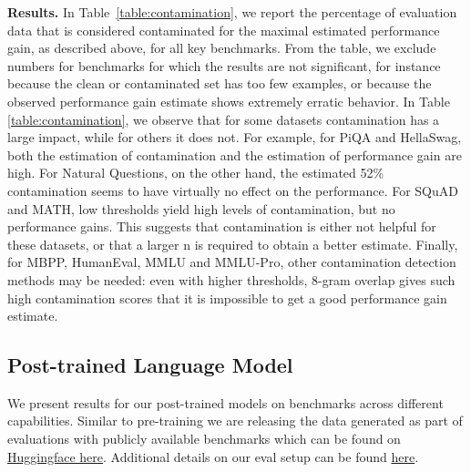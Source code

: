 \documentclass[dvipsnames]{fairmeta}
\begin{document}
\textbf{Results.}
In Table~\ref{table:contamination}, we report the percentage of evaluation data that is considered contaminated for the maximal estimated performance gain, as described above, for all key benchmarks.
From the table, we exclude numbers for benchmarks for which the results are not significant, for instance because the clean or contaminated set has too few examples, or because the observed performance gain estimate shows extremely erratic behavior.
In Table \ref{table:contamination}, we observe that for some datasets contamination has a large impact, while for others it does not.
For example, for PiQA and HellaSwag, both the estimation of contamination and the estimation of performance gain are high.
For Natural Questions, on the other hand, the estimated 52\% contamination seems to have virtually no effect on the performance.
For SQuAD and MATH, low thresholds yield high levels of contamination, but no performance gains. This suggests that contamination is either not helpful for these datasets, or that a larger n is required to obtain a better estimate.
Finally, for MBPP, HumanEval, MMLU and MMLU-Pro, other contamination detection methods may be needed: even with higher thresholds, 8-gram overlap gives such high contamination scores that it is impossible to get a good performance gain estimate.

\subsection{Post-trained Language Model}
\label{section:results_finetuned}

We present results for our \llamathree post-trained models on benchmarks across different capabilities.
Similar to pre-training we are releasing the data generated as part of evaluations with publicly available benchmarks which can be found on \href{https://huggingface.co/meta-llama}{Huggingface here}. Additional details on our eval setup can be found \href{https://github.com/meta-llama/llama-models/blob/main/models/llama3_1/eval_details.md}{here}.
\end{document}
